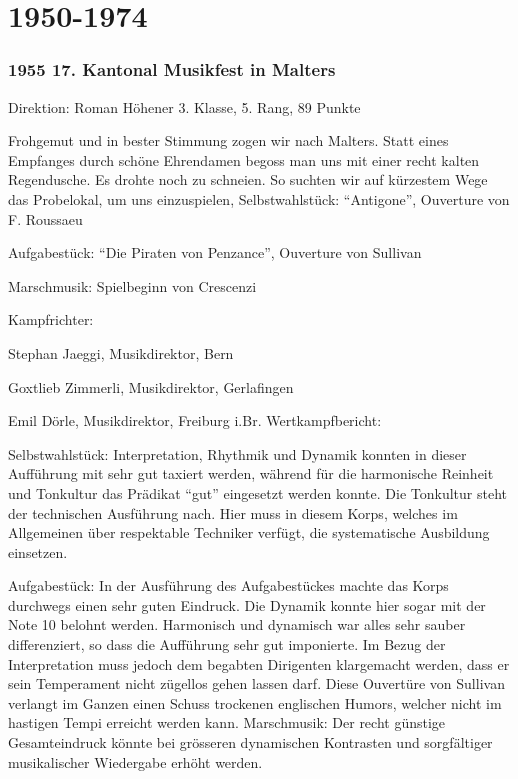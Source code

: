 \section{1950-1974}

\begin{history}

    \subsubsection{1955 17. Kantonal Musikfest in Malters}

    Direktion: Roman Höhener 3. Klasse, 5. Rang, 89 Punkte

    Frohgemut und in bester Stimmung zogen wir nach Malters. Statt eines
    Empfanges durch schöne Ehrendamen begoss man uns mit einer recht kalten
    Regendusche. Es drohte noch zu schneien. So suchten wir auf kürzestem Wege
    das Probelokal, um uns einzuspielen, Selbstwahlstück: \enquote{Antigone},
    Ouverture von F. Roussaeu

    Aufgabestück: \enquote{Die Piraten von Penzance}, Ouverture von Sullivan

    Marschmusik: Spielbeginn von Crescenzi

    Kampfrichter:

    Stephan Jaeggi, Musikdirektor, Bern

    Goxtlieb Zimmerli, Musikdirektor, Gerlafingen

    Emil Dörle, Musikdirektor, Freiburg i.Br. Wertkampfbericht:

    Selbstwahlstück: Interpretation, Rhythmik und Dynamik konnten in dieser
    Aufführung mit sehr gut taxiert werden, während für die harmonische Reinheit
    und Tonkultur das Prädikat \enquote{gut} eingesetzt werden konnte. Die
    Tonkultur steht der technischen Ausführung nach. Hier muss in diesem Korps,
    welches im Allgemeinen über respektable Techniker verfügt, die systematische
    Ausbildung einsetzen.

    Aufgabestück: In der Ausführung des Aufgabestückes machte das Korps
    durchwegs einen sehr guten Eindruck. Die Dynamik konnte hier sogar mit der
    Note 10 belohnt werden. Harmonisch und dynamisch war alles sehr sauber
    differenziert, so dass die Aufführung sehr gut imponierte. Im Bezug der
    Interpretation muss jedoch dem begabten Dirigenten klargemacht werden, dass
    er sein Temperament nicht zügellos gehen lassen darf. Diese Ouvertüre von
    Sullivan verlangt im Ganzen einen Schuss trockenen englischen Humors,
    welcher nicht im hastigen Tempi erreicht werden kann. Marschmusik: Der recht
    günstige Gesamteindruck könnte bei grösseren dynamischen Kontrasten und
    sorgfältiger musikalischer Wiedergabe erhöht werden.



\end{history}
